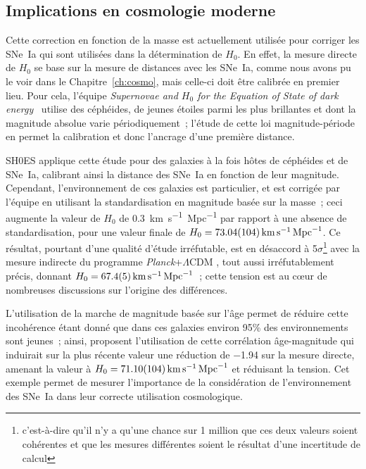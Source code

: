 \documentclass[../main/main.tex]{subfiles}
\begin{document}
\subsection{Implications en cosmologie moderne}\label{ssec:mcosmo}

Cette correction en fonction de la masse est actuellement utilisée pour corriger
les SNe~Ia qui sont utilisées dans la détermination de $H_0$. En effet, la
mesure directe de $H_0$ se base sur la mesure de distances avec les SNe~Ia,
comme nous avons pu le voir dans le Chapitre~\ref{ch:cosmo}, mais celle-ci doit
être calibrée en premier lieu. Pour cela, l'équipe \textit{Supernovae and
$H_0$ for the Equation of State of dark energy}~\citep[SH0ES,
Supernovae et $H_0$ pour l'équation d'état de l'énergie sombre][]{riess2021}
utilise des céphéides, de jeunes étoiles parmi les plus brillantes et dont la
magnitude absolue varie périodiquement~; l'étude de cette loi magnitude-période
en permet la calibration et donc l'ancrage d'une première distance.

SH0ES applique cette étude pour des galaxies à la fois hôtes de céphéides et de
SNe~Ia, calibrant ainsi la distance des SNe~Ia en fonction de leur magnitude.
Cependant, l'environnement de ces galaxies est particulier, et est corrigée par
l'équipe en utilisant la standardisation en magnitude basée sur la masse~; ceci
augmente la valeur de $H_0$ de \SI{0.3}{km.s^{-1}.Mpc^{-1}} par rapport à une
absence de standardisation, pour une valeur finale de $H_0 =
\SI{73.04\pm1.04}{km.s^{-1}.Mpc^{-1}}$. Ce résultat, pourtant d'une qualité
d'étude irréfutable, est en désaccord à 5$\sigma$\footnote{c'est-à-dire qu'il
    n'y a qu'une chance sur 1 million que ces deux valeurs soient cohérentes et
que les mesures différentes soient le résultat d'une incertitude de calcul}
avec la mesure indirecte du programme \textit{Planck}+$\Lambda$CDM
\citep{planck2018}, tout aussi irréfutablement précis, donnant $H_0 =
\SI{67.4\pm0.5}{km.s^{-1}.Mpc^{-1}}$~; cette tension est au cœur de
nombreuses discussions sur l'origine des différences.

L'utilisation de la marche de magnitude basée sur l'âge permet de réduire cette
incohérence étant donné que dans ces galaxies environ 95\% des environnements
sont jeunes~; ainsi, \cite{rigault2015} proposent l'utilisation de cette
corrélation âge-magnitude qui induirait sur la plus récente valeur une réduction
de \num{-1.94} sur la mesure directe, amenant la valeur à $H_0 =
\SI{71.10\pm1.04}{km.s^{-1}.Mpc^{-1}}$ et réduisant la tension. Cet exemple
permet de mesurer l'importance de la considération de l'environnement des SNe~Ia
dans leur correcte utilisation cosmologique.
\end{document}
